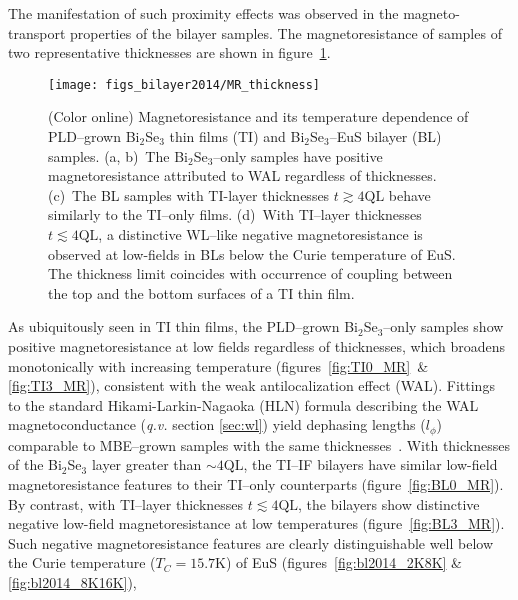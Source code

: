 The manifestation of such proximity effects was observed in the magneto-transport properties of the bilayer samples. The magnetoresistance of samples of two representative thicknesses are shown in figure~\ref{fig:bl2014_MR_thickness}.%
%
\begin{figure}[ht]%
\centering%
\subfloat{\label{fig:TI0_MR}}%
\subfloat{\label{fig:TI3_MR}}%
\subfloat{\label{fig:BL0_MR}}%
\subfloat{\label{fig:BL3_MR}}%
\texttt{[image: figs\_bilayer2014/MR\_thickness]}%
\caption[Magnetoresistance of various Bi$_2$Se$_3$ thin films and Bi$_2$Se$_3$--EuS bilayers]{\label{fig:bl2014_MR_thickness}(Color online) Magnetoresistance and its temperature dependence of PLD--grown Bi$_2$Se$_3$ thin films (TI) and Bi$_2$Se$_3$--EuS bilayer (BL) samples. (a, b)~The Bi$_2$Se$_3$--only samples have positive magnetoresistance attributed to WAL regardless of thicknesses. (c)~The BL samples with TI-layer thicknesses $t\gtrsim4\mathrm{QL}$ behave similarly to the TI--only films. (d)~With TI--layer thicknesses $t\lesssim4\mathrm{QL}$, a distinctive WL--like negative magnetoresistance is observed at low-fields in BLs below the Curie temperature of EuS. The thickness limit coincides with occurrence of coupling between the top and the bottom surfaces of a TI thin film.}%
\end{figure} %
%
As ubiquitously seen in TI thin films, the PLD--grown Bi$_2$Se$_3$--only samples show positive magnetoresistance at low fields regardless of thicknesses, which broadens monotonically with increasing temperature (figures~\ref{fig:TI0_MR}~\& \ref{fig:TI3_MR}), consistent with the weak antilocalization effect (WAL). Fittings to the standard Hikami-Larkin-Nagaoka (HLN) formula describing the WAL magnetoconductance (\textit{q.v.} section \ref{sec:wl}) yield dephasing lengths ($l_\phi$) comparable to MBE--grown samples with the same thicknesses~\cite{TI_WAL_thickness, zhangli2013}. With thicknesses of the Bi$_2$Se$_3$ layer greater than $\sim4\mathrm{QL}$, the TI--IF bilayers have similar low-field magnetoresistance features to their TI--only counterparts (figure~\ref{fig:BL0_MR}). By contrast, with TI--layer thicknesses $t\lesssim4\mathrm{QL}$, the bilayers show distinctive negative low-field magnetoresistance at low temperatures (figure~\ref{fig:BL3_MR}). Such negative magnetoresistance features are clearly distinguishable well below the Curie temperature ($T_C=15.7$K) of EuS (figures~\ref{fig:bl2014_2K8K} \& \ref{fig:bl2014_8K16K}), %
%
%
